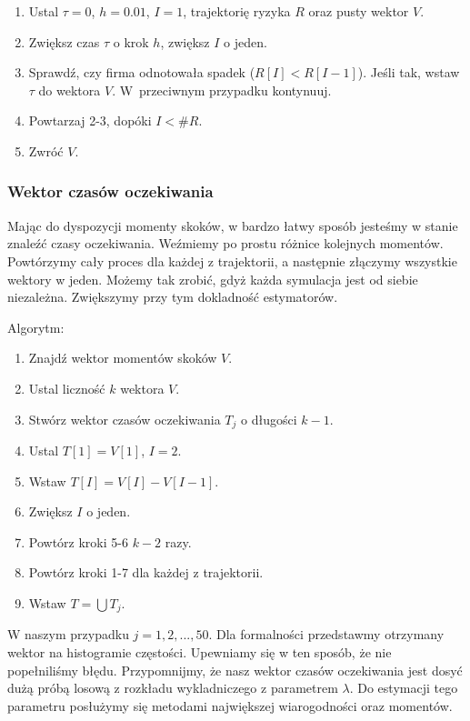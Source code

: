 \documentclass{article}
\theoremstyle{break}
\numberwithin{equation}{subsection}
\numberwithin{figure}{section}
\begin{document}
\begin{enumerate}
\item Ustal $\tau=0$, $h=0.01$, $I = 1$, trajektorię ryzyka $R$ oraz pusty wektor $V.$
\item Zwiększ czas $\tau$ o krok $h$, zwiększ $I$ o jeden.
\item Sprawdź, czy firma odnotowała spadek ($R[I] < R[I-1]$). Jeśli tak, wstaw $\tau$ do wektora $V$. W~przeciwnym przypadku kontynuuj.
\item Powtarzaj 2-3, dopóki $I < \#R$.
\item Zwróć $V.$
\end{enumerate}

\subsubsection*{Wektor czasów oczekiwania}

Mając do dyspozycji momenty skoków, w bardzo łatwy sposób jesteśmy w stanie znaleźć czasy oczekiwania. Weźmiemy po prostu różnice kolejnych momentów. Powtórzymy cały proces dla każdej z trajektorii, a następnie złączymy wszystkie wektory w jeden. Możemy tak zrobić, gdyż każda symulacja jest od siebie niezależna. Zwiększymy przy tym dokladność estymatorów.

Algorytm:

\begin{enumerate}
\item Znajdź wektor momentów skoków $V$.
\item Ustal liczność $k$ wektora $V$.
\item Stwórz wektor czasów oczekiwania $T_j$ o długości $k-1$.
\item Ustal $T[1] = V[1]$, $I=2$.
\item Wstaw $T[I] = V[I] - V[I-1]$.
\item Zwiększ $I$ o jeden.
\item Powtórz kroki 5-6 $k-2$ razy.
\item Powtórz kroki 1-7 dla każdej z trajektorii.
\item Wstaw $T = \bigcup T_j$.
\end{enumerate}

W naszym przypadku $j = 1, 2, ...,50$. Dla formalności przedstawmy otrzymany wektor na histogramie częstości. Upewniamy się w ten sposób, że nie popełniliśmy błędu.
Przypomnijmy, że nasz wektor czasów oczekiwania jest dosyć dużą próbą losową z rozkładu wykladniczego z parametrem $\lambda$. Do estymacji tego parametru posłużymy się metodami największej wiarogodności oraz momentów.\\
\end{document}
